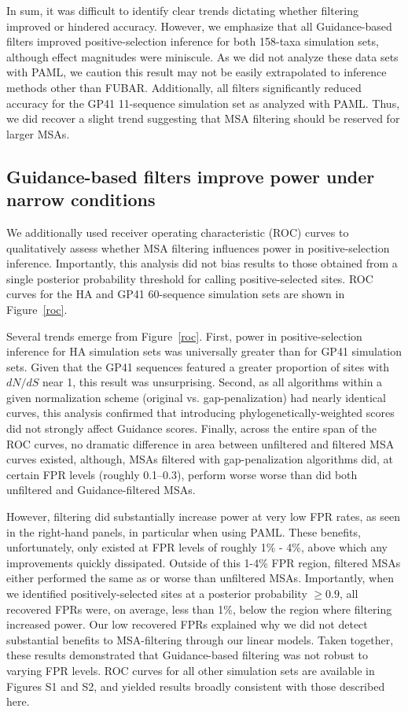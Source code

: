 \documentclass[11pt]{article}
\begin{document}
In sum, it was difficult to identify clear trends dictating whether filtering improved or hindered accuracy. However, we emphasize that all Guidance-based filters improved positive-selection inference for both 158-taxa simulation sets, although effect magnitudes were miniscule. As we did not analyze these data sets with PAML, we caution this result may not be easily extrapolated to inference methods other than FUBAR. Additionally, all filters significantly reduced accuracy for the GP41 11-sequence simulation set as analyzed with PAML. Thus, we did recover a slight trend suggesting that MSA filtering should be reserved for larger MSAs.

\subsection*{Guidance-based filters improve power under narrow conditions}

We additionally used receiver operating characteristic (ROC) curves to qualitatively assess whether MSA filtering influences power in positive-selection inference. Importantly, this analysis did not bias results to those obtained from a single posterior probability threshold for calling positive-selected sites. ROC curves for the HA and GP41 60-sequence simulation sets are shown in Figure~\ref{roc}. 

Several trends emerge from Figure~\ref{roc}. First, power in positive-selection inference for HA simulation sets was universally greater than for GP41 simulation sets. Given that the GP41 sequences featured a greater proportion of sites with $dN/dS$ near 1, this result was unsurprising. Second, as all algorithms within a given normalization scheme (original vs. gap-penalization) had nearly identical curves, this analysis confirmed that introducing phylogenetically-weighted scores did not strongly affect Guidance scores. Finally, across the entire span of the ROC curves, no dramatic difference in area between unfiltered and filtered MSA curves existed, although, MSAs filtered with gap-penalization algorithms did, at certain FPR levels (roughly 0.1--0.3), perform worse worse than did both unfiltered and Guidance-filtered MSAs. 

However, filtering did substantially increase power at very low FPR rates, as seen in the right-hand panels, in particular when using PAML. These benefits, unfortunately, only existed at FPR levels of roughly 1\% - 4\%, above which any improvements quickly dissipated. Outside of this 1-4\% FPR region, filtered MSAs either performed the same as or worse than unfiltered MSAs.
Importantly, when we identified positively-selected sites at a posterior probability $\geq 0.9$, all recovered FPRs were, on average, less than 1\%, below the region where filtering increased power. Our low recovered FPRs explained why we did not detect substantial benefits to MSA-filtering through our linear models. Taken together, these results demonstrated that Guidance-based filtering was not robust to varying FPR levels. ROC curves for all other simulation sets are available in Figures S1 and S2, and yielded results broadly consistent with those described here.
\end{document}
